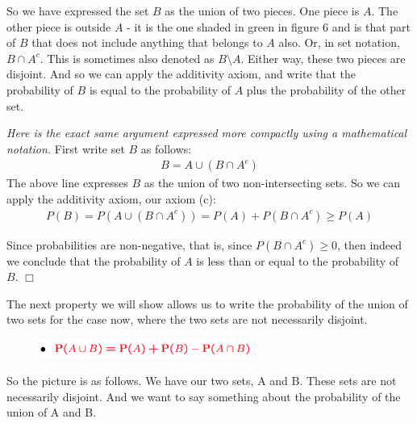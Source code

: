 \documentclass{tufte-handout}
\begin{document}
So we have expressed the set $B$ as the union of two pieces. One piece is $A$. The other piece is
outside $A$ - it is the one shaded in green in figure 6 and is that part of $B$ that does not include anything that belongs to $A$ also. Or, in set notation, $B \cap A^c$. This is sometimes also denoted as $B \setminus A$. Either way, these two pieces are disjoint. And so we can apply the additivity axiom, and write that the
probability of $B$ is equal to the probability of $A$ plus the probability of the other set.

\vspace{0.2cm}
\textit{Here is the exact same argument expressed more compactly using a mathematical notation.} First write set $B$ as follows: 
\begin{align*}
B = A \cup (B \cap A^c)
\end{align*}
The above line expresses $B$ as the union of two non-intersecting sets. So we can apply the additivity axiom, our axiom (c):
\begin{align*}
P(B )= P(A \cup (B \cap A^c)) = P(A) + P(B \cap A^c) \geq P(A)
\end{align*}

Since probabilities are non-negative, that is, since $P(B \cap A^c) \geq 0$, then indeed  we conclude that the probability of $A$ is less than or equal to the probability of $B.$ $\Box$


 The next property we will show allows us to write the probability of the union of two
sets for the case now, where the two sets are not necessarily disjoint. 

\begin{figure}
  \includegraphics[width=7cm]{Conseq2}
\end{figure}

So the picture is as follows. We
have our two sets, A and B. These sets are not necessarily disjoint. And we want to say something
about the probability of the union of A and B.
\end{document}
